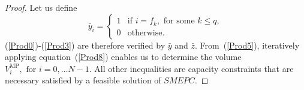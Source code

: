 \documentclass[11pt]{article}
\theoremstyle{plain}%
\theoremstyle{definition} \newtheorem{lem}{Lemma}[section]
\theoremstyle{definition} \newtheorem{claim}{Claim}[lem]
\theoremstyle{definition} \newtheorem{theorem}{Theorem}[section]
\theoremstyle{definition} \newtheorem{exo}{Exercice n$^\circ$}
\theoremstyle{definition} \newtheorem{quest}{}[exo]
\theoremstyle{definition} \newtheorem{sousquest}{}[quest]
\theoremstyle{remark}
\theoremstyle{definition}
\begin{document}
\begin{proof}
Let us define
\begin{displaymath}
\bar{y}_i = 
\left\{ \begin{array}{cl}
1 & \textrm{if } i = f_k, \textrm{ for some } k \le q, \\
0 & \textrm{otherwise.}
\end{array} \right.
\end{displaymath}
(\ref{Prod0})-(\ref{Prod3}) are  therefore verified by $\bar{y}$ and $\bar{z}$. 
From~(\ref{Prod5}), iteratively applying   equation~(\ref{Prod8})  enables us to determine 
the volume $V^{\textrm{MP}}_{i}, \textrm{ for } i=0, \ldots N-1$. All other inequalities are 
capacity constraints that are necessary satisfied by a feasible solution of  $SMEPC$.



%
%
%
%
%


\end{proof}
\end{document}
